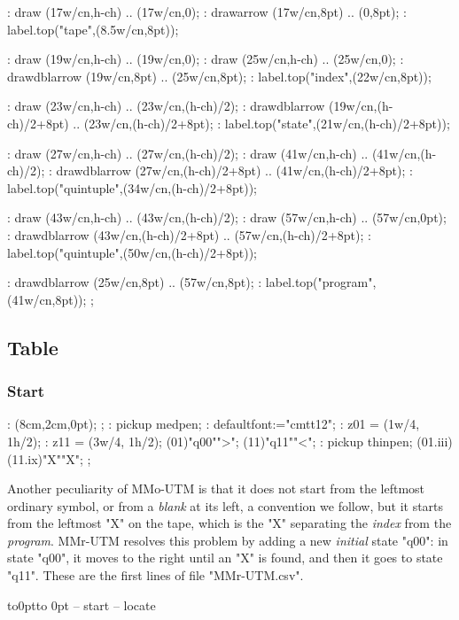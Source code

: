 \MT: draw (17w/cn,h-ch) .. (17w/cn,0);
\MT: drawarrow  (17w/cn,8pt) .. (0,8pt);
\MT: label.top("tape",(8.5w/cn,8pt));

\MT: draw (19w/cn,h-ch) .. (19w/cn,0);
\MT: draw (25w/cn,h-ch) .. (25w/cn,0);
\MT: drawdblarrow  (19w/cn,8pt) .. (25w/cn,8pt);
\MT: label.top("index",(22w/cn,8pt));

\MT: draw (23w/cn,h-ch) .. (23w/cn,(h-ch)/2);
\MT: drawdblarrow  (19w/cn,(h-ch)/2+8pt) .. (23w/cn,(h-ch)/2+8pt);
\MT: label.top("state",(21w/cn,(h-ch)/2+8pt));

\MT: draw (27w/cn,h-ch) .. (27w/cn,(h-ch)/2);
\MT: draw (41w/cn,h-ch) .. (41w/cn,(h-ch)/2);
\MT: drawdblarrow  (27w/cn,(h-ch)/2+8pt) .. (41w/cn,(h-ch)/2+8pt);
\MT: label.top("quintuple",(34w/cn,(h-ch)/2+8pt));

\MT: draw (43w/cn,h-ch) .. (43w/cn,(h-ch)/2);
\MT: draw (57w/cn,h-ch) .. (57w/cn,0pt);
\MT: drawdblarrow  (43w/cn,(h-ch)/2+8pt) .. (57w/cn,(h-ch)/2+8pt);
\MT: label.top("quintuple",(50w/cn,(h-ch)/2+8pt));

\MT: drawdblarrow  (25w/cn,8pt) .. (57w/cn,8pt);
\MT: label.top("program",(41w/cn,8pt));
\MTendfig;

\centerline{\box\MTbox}


\subsection{Table}

\subsubsection{Start}

\MT:
\MTbeginfig(8cm,2cm,0pt);
\MTresetpa;
\MT: pickup medpen;
\MT: defaultfont:="cmtt12";
\MT:  z01 = (1w/4, 1h/2);
\MT:  z11 = (3w/4, 1h/2);
\MTstate(01)"q00"">";
\MTstate(11)"q11""<";
\MT: pickup thinpen;
\MTinput(01.iii)(11.ix)"X""X";
\MTendfig;

Another peculiarity of MMo-UTM is that
it does not start from the leftmost ordinary symbol,
or from a {\em blank} at its left, a convention we follow,
but it starts from the leftmost "X" on the tape,
which is the "X" separating the {\em index} from the {\em program}.
MMr-UTM resolves this problem by adding a new {\em initial} state "q00":
in state "q00", it moves to the right until an "X" is found,
and then it goes to state "q11".
These are the first lines of file "MMr-UTM.csv".
\par\kern-12pt\vbox to0pt{\kern6pt\hbox to 0pt{\kern5cm\box\MTbox\hss}\vss}
-- start
-- locate



